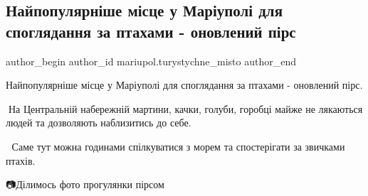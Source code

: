  
 
 
 
 

\subsection{Найпопулярніше місце у Маріуполі для споглядання за птахами - оновлений пірс}
\label{sec:29_11_2021.fb.mariupol.turystychne_misto.1.naipopulyarn_she_m_s}

\ifcmt
 author_begin
   author_id mariupol.turystychne_misto
 author_end
\fi

Найпопулярніше місце у Маріуполі для споглядання за птахами - оновлений пірс. 

🦢На Центральній набережній мартини, качки, голуби, горобці майже не лякаються
людей та дозволяють наблизитись до себе.

🦆 Саме тут можна годинами спілкуватися з морем та спостерігати за звичками
птахів.

📷Ділимось фото прогулянки пірсом
